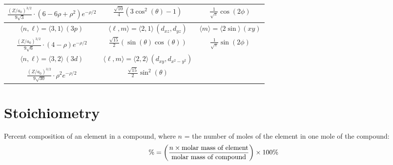 \documentclass[10pt]{article}
\begin{document}
\begin{table}[htbp]
\begin{tabular}{ccc}
                $\displaystyle\frac{(Z/a_0)^{3/2}}{9\sqrt{3}}\cdot(6-6\rho+\rho^2)e^{-\rho/2}$ & $\displaystyle\frac{\sqrt{10}}{4}\left(3\cos^2(\theta)-1\right)$ & $\displaystyle\frac{1}{\sqrt{\pi}}\cos(2\phi)$ \\   

                \midrule    

                $\langle n,\ell\rangle = \langle 3,1\rangle \, (3p) $ & $\langle \ell,m \rangle = \langle 2,1\rangle \, (d_{xz},d_{yz})$ & $\langle m \rangle= \langle 2\sin \rangle \, (xy)$ \\[1ex]   

                $\displaystyle\frac{(Z/a_0)^{3/2}}{9\sqrt{6}}\cdot(4-\rho)e^{-\rho/2}$ & $\displaystyle\frac{\sqrt{15}}{2}\left(\sin(\theta)\cos(\theta)\right)$ & $\displaystyle\frac{1}{\sqrt{\pi}}\sin(2\phi)$ \\

                \midrule

                $\langle n,\ell\rangle = \langle 3,2\rangle \, (3d) $ & $\langle \ell,m \rangle = \langle 2,2\rangle \, (d_{xy},d_{x^2-y^2})$ & \\[1ex]

                $\displaystyle\frac{(Z/a_0)^{3/2}}{9\sqrt{30}}\cdot\rho^2e^{-\rho/2}$ & $\displaystyle\frac{\sqrt{15}}{2}\sin^2(\theta)$ & \\
            
            \bottomrule
        \end{tabular}
    \label{tab:psi}
\end{table}


\section{Stoichiometry}

Percent composition of an element in a compound, where $n$ = the number of moles of the element in one mole of the compound:
\begin{equation*}
\% = \left(\frac{n\times \textnormal{molar mass of element}}{\textnormal{molar mass of compound}}\right)\times 100\%
\end{equation*}
\end{document}
